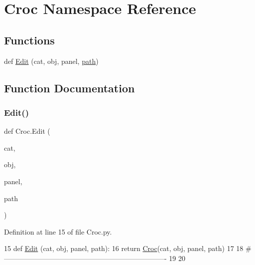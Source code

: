 \hypertarget{namespaceCroc}{}\section{Croc Namespace Reference}
\label{namespaceCroc}
\subsection*{Functions}
\begin{DoxyCompactItemize}
\item 
def \hyperlink{namespaceCroc_ac1007cd977e479210af9ec4c28eba462}{Edit} (cat, obj, panel, \hyperlink{classHierarchy_aa7990fa7caf132d83e361ce033c6c65a}{path})
\end{DoxyCompactItemize}


\subsection{Function Documentation}
\mbox{\label{namespaceCroc_ac1007cd977e479210af9ec4c28eba462}} 
\subsubsection{\texorpdfstring{Edit()}{Edit()}}
{\footnotesize\ttfamily def Croc.\+Edit (\begin{DoxyParamCaption}\item[{}]{cat,  }\item[{}]{obj,  }\item[{}]{panel,  }\item[{}]{path }\end{DoxyParamCaption})}



Definition at line 15 of file Croc.\+py.


\begin{DoxyCode}
15 \textcolor{keyword}{def }\hyperlink{namespaceCroc_ac1007cd977e479210af9ec4c28eba462}{Edit} (cat, obj, panel, path):
16     \textcolor{keywordflow}{return} \hyperlink{classCroc}{Croc}(cat, obj, panel, path)
17 
18 \textcolor{comment}{#----------------------------------------------------------------------}
19 
20 \end{DoxyCode}
